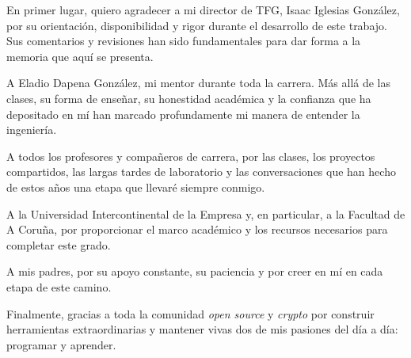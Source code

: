 En primer lugar, quiero agradecer a mi director de TFG, Isaac Iglesias González, por su orientación, disponibilidad y rigor durante el desarrollo de este trabajo. Sus comentarios y revisiones han sido fundamentales para dar forma a la memoria que aquí se presenta.

A Eladio Dapena González, mi mentor durante toda la carrera. Más allá de las clases, su forma de enseñar, su honestidad académica y la confianza que ha depositado en mí han marcado profundamente mi manera de entender la ingeniería.

A todos los profesores y compañeros de carrera, por las clases, los proyectos compartidos, las largas tardes de laboratorio y las conversaciones que han hecho de estos años una etapa que llevaré siempre conmigo.

A la Universidad Intercontinental de la Empresa y, en particular, a la Facultad de A Coruña, por proporcionar el marco académico y los recursos necesarios para completar este grado.

A mis padres, por su apoyo constante, su paciencia y por creer en mí en cada etapa de este camino.

Finalmente, gracias a toda la comunidad \emph{open source} y \emph{crypto} por construir herramientas extraordinarias y mantener vivas dos de mis pasiones del día a día: programar y aprender.

